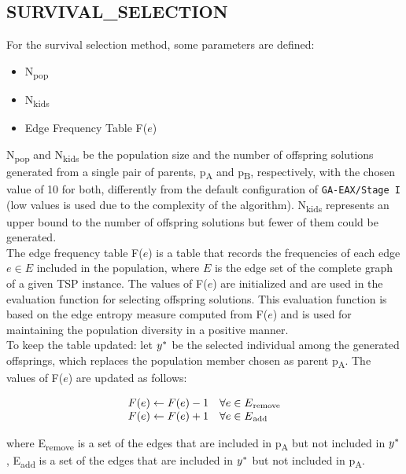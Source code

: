 \subsection{SURVIVAL\_SELECTION}
For the survival selection method, some parameters are defined: 
\begin{itemize}
\item N\textsubscript{pop}
\item N\textsubscript{kids}
\item Edge Frequency Table F($e$)
\end{itemize}
N\textsubscript{pop} and N\textsubscript{kids} be the population size and the number of offspring solutions generated from a single pair of parents, p\textsubscript{A} and p\textsubscript{B}, respectively, with the chosen value of 10 for both, differently from the default configuration of \texttt{GA-EAX/Stage I} \cite{Nagata2013} (low values is used due to the complexity of the algorithm). N\textsubscript{kids} represents an upper bound to the number of offspring solutions but fewer of them could be generated.\\
The edge frequency table F($e$) is a table that records the frequencies of each edge $e \in E$ included in the population, where $E$ is the edge set of the complete graph of a given TSP instance. The values of F($e$) are initialized and are used in the evaluation function for selecting offspring solutions. This evaluation function is based on the edge entropy measure computed from F($e$) and is used for maintaining the population diversity in a positive manner. \\
To keep the table updated: let $y\ssymbol{1}$ be the selected individual among the generated offsprings, which replaces the population member chosen as parent p\textsubscript{A}. The values of F($e$) are updated as follows: 

\begin{equation}\begin{array}{ll}
F(e) \leftarrow F(e)-1 & \forall e \in E\textsubscript{remove} \\
F(e) \leftarrow F(e)+1 & \forall e \in E\textsubscript{add}
\end{array}\end{equation}

where E\textsubscript{remove} is a set of the edges that are included in p\textsubscript{A} but not included in $y\ssymbol{1}$, E\textsubscript{add} is a set of the edges that are included in $y\ssymbol{1}$ but not included in p\textsubscript{A}. \\

